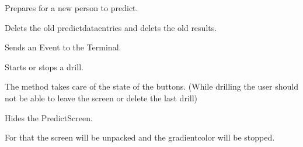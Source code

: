\documentclass[letterpaper,10pt,english]{sphinxmanual}
\begin{document}
\begin{fulllineitems}
\begin{fulllineitems}
\end{fulllineitems}


\begin{fulllineitems}
\label{\detokenize{anoog.automation:anoog.automation.graphical_user_interface.Predict_Window.event_reset_button}}
\sphinxAtStartPar
Prepares for a new person to predict.

\sphinxAtStartPar
Delets the old predict\sphinxhyphen{}data\sphinxhyphen{}entries and delets the old results.

\sphinxAtStartPar
Sends an Event to the Terminal.

\end{fulllineitems}


\begin{fulllineitems}
\label{\detokenize{anoog.automation:anoog.automation.graphical_user_interface.Predict_Window.event_start_button}}
\sphinxAtStartPar
Starts or stops a drill.

\sphinxAtStartPar
The method takes care of the state of the buttons. (While drilling the user should not be able to leave the screen or delete the last drill)

\end{fulllineitems}


\begin{fulllineitems}
\label{\detokenize{anoog.automation:anoog.automation.graphical_user_interface.Predict_Window.hide}}
\sphinxAtStartPar
Hides the Predict\sphinxhyphen{}Screen.

\sphinxAtStartPar
For that the screen will be unpacked and the gradient\sphinxhyphen{}color will be stopped.


\end{fulllineitems}
\end{fulllineitems}
\end{document}
